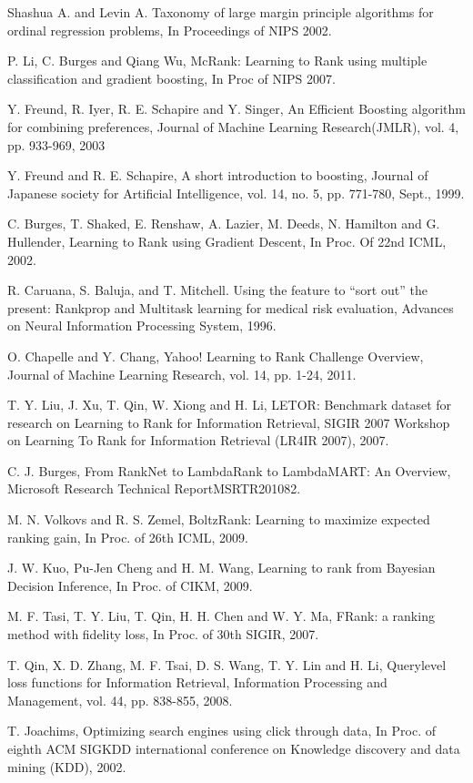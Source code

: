 \documentclass[]{article}
\begin{document}
\begin{thebibliography}{1}


Shashua A. and Levin A. Taxonomy of large margin principle algorithms for ordinal regression problems, In Proceedings of NIPS 2002.

 P. Li, C. Burges and Qiang Wu, McRank: Learning to Rank using
multiple classification and gradient boosting, In Proc of NIPS 2007.

 Y. Freund, R. Iyer, R. E. Schapire and Y. Singer, An Efficient Boosting algorithm for combining preferences, Journal of Machine Learning Research(JMLR), vol. 4, pp. 933-969, 2003

 Y. Freund and R. E. Schapire, A short introduction to boosting, Journal
of Japanese society for Artificial Intelligence, vol. 14, no. 5, pp. 771-780,
Sept., 1999.

 C. Burges, T. Shaked, E. Renshaw, A. Lazier, M. Deeds, N. Hamilton
and G. Hullender, Learning to Rank using Gradient Descent, In Proc. Of
22nd ICML, 2002.

 R. Caruana, S. Baluja, and T. Mitchell. Using the feature to “sort out” the
present: Rankprop and Multitask learning for medical risk evaluation,
Advances on Neural Information Processing System, 1996.

 O. Chapelle and Y. Chang, Yahoo! Learning to Rank Challenge
Overview, Journal of Machine Learning Research, vol. 14, pp. 1-24,
2011.

 T. Y. Liu, J. Xu, T. Qin, W. Xiong and H. Li, LETOR: Benchmark
dataset for research on Learning to Rank for Information Retrieval,
SIGIR 2007 Workshop on Learning To Rank for Information Retrieval
(LR4IR 2007), 2007.

 C. J. Burges, From RankNet to LambdaRank to LambdaMART: An
Overview, Microsoft Research Technical ReportMSRTR201082.

 M. N. Volkovs and R. S. Zemel, BoltzRank: Learning to maximize
expected ranking gain, In Proc. of 26th ICML, 2009.

 J. W. Kuo, Pu-Jen Cheng and H. M. Wang, Learning to rank from
Bayesian Decision Inference, In Proc. of CIKM, 2009.

 M. F. Tasi, T. Y. Liu, T. Qin, H. H. Chen and W. Y. Ma, FRank: a
ranking method with fidelity loss, In Proc. of 30th SIGIR, 2007.

 T. Qin, X. D. Zhang, M. F. Tsai, D. S. Wang, T. Y. Lin and H. Li, Querylevel loss functions for Information Retrieval, Information
Processing and Management, vol. 44, pp. 838-855, 2008.

T. Joachims, Optimizing search engines using click through data, In Proc.
of eighth ACM SIGKDD international conference on Knowledge discovery and data mining (KDD), 2002.
\end{thebibliography}
\end{document}
